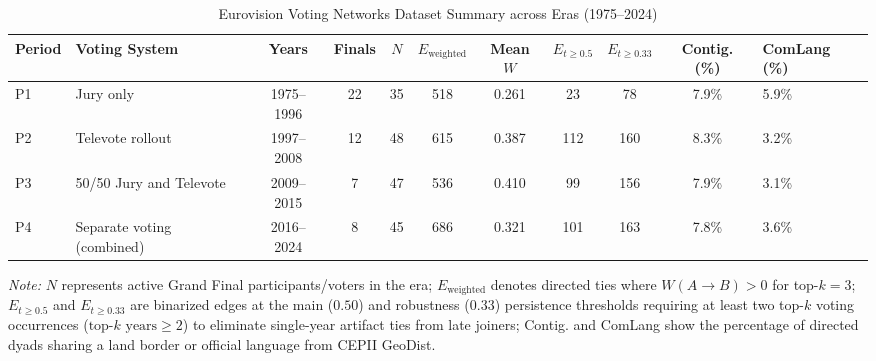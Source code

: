 \begin{table}[htbp]
\centering
\caption{Eurovision Voting Networks Dataset Summary across Eras (1975--2024)}
\label{tab:dataset_summary}
\small
\begin{tabular}{l l c c c c c c c c}
\hline\hline
Period & Voting System & Years & Finals & $N$ & $E_{\text{weighted}}$ & Mean $W$ & $E_{t \ge 0.5}$ & $E_{t \ge 0.33}$ & Contig. (\%) & ComLang (\%) \\
\hline
P1 & Jury only & 1975--1996 & 22 & 35 & 518 & 0.261 & 23 & 78 & 7.9\% & 5.9\% \\
P2 & Televote rollout & 1997--2008 & 12 & 48 & 615 & 0.387 & 112 & 160 & 8.3\% & 3.2\% \\
P3 & 50/50 Jury and Televote & 2009--2015 & 7 & 47 & 536 & 0.410 & 99 & 156 & 7.9\% & 3.1\% \\
P4 & Separate voting (combined) & 2016--2024 & 8 & 45 & 686 & 0.321 & 101 & 163 & 7.8\% & 3.6\% \\
\hline\hline
\end{tabular}
\begin{tablenotes}
\footnotesize
\item \textit{Note:} $N$ represents active Grand Final participants/voters in the era; $E_{\text{weighted}}$ denotes directed ties where $W(A \to B) > 0$ for top-$k=3$; $E_{t \ge 0.5}$ and $E_{t \ge 0.33}$ are binarized edges at the main ($0.50$) and robustness ($0.33$) persistence thresholds requiring at least two top-$k$ voting occurrences ($\text{top-}k\text{ years} \ge 2$) to eliminate single-year artifact ties from late joiners; Contig. and ComLang show the percentage of directed dyads sharing a land border or official language from CEPII GeoDist.
\end{tablenotes}
\end{table}
